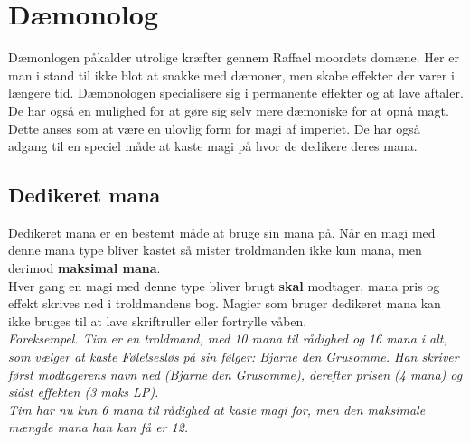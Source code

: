 \chapter{Dæmonolog}
Dæmonlogen påkalder utrolige kræfter gennem Raffael moordets domæne. Her er man i stand til ikke blot at snakke med dæmoner, men skabe effekter der varer i længere tid. Dæmonologen specialisere sig i permanente effekter og at lave aftaler. De har også en mulighed for at gøre sig selv mere dæmoniske for at opnå magt. Dette anses som at være en ulovlig form for magi af imperiet. De har også adgang til en speciel måde at kaste magi på hvor de dedikere deres mana.

\section{Dedikeret mana}
Dedikeret mana er en bestemt måde at bruge sin mana på. Når en magi med denne mana type bliver kastet så mister troldmanden ikke kun mana, men derimod \textbf{maksimal mana}.\\ Hver gang en magi med denne type bliver brugt \textbf{skal} modtager, mana pris og effekt skrives ned i troldmandens bog. Magier som bruger dedikeret mana kan ikke bruges til at lave skriftruller eller fortrylle våben.\\

\textit{Foreksempel. Tim er en troldmand, med 10 mana til rådighed og 16 mana i alt, som vælger at kaste Følelsesløs på sin følger: Bjarne den Grusomme. Han skriver først modtagerens navn ned (Bjarne den Grusomme), derefter prisen (4 mana) og sidst effekten (3 maks LP).\\
Tim har nu kun 6 mana til rådighed at kaste magi for, men den maksimale mængde mana han kan få er 12.}\\

